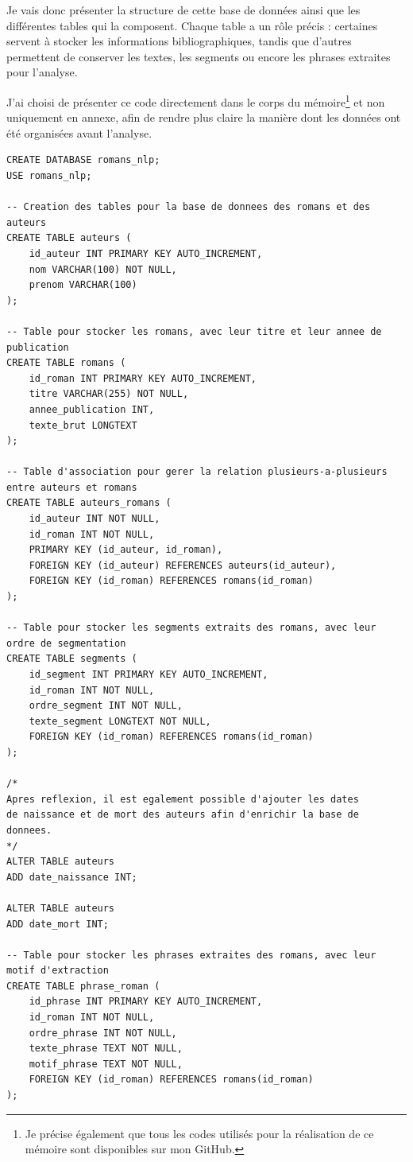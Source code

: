 Je vais donc présenter la structure de cette base de données ainsi que les différentes tables qui la composent. Chaque table a un rôle précis : certaines servent à stocker les informations bibliographiques, tandis que d'autres permettent de conserver les textes, les segments ou encore les phrases extraites pour l'analyse.

J'ai choisi de présenter ce code directement dans le corps du mémoire\footnote{Je précise également que tous les codes utilisés pour la réalisation de ce mémoire sont disponibles sur mon GitHub.} et non uniquement en annexe, afin de rendre plus claire la manière dont les données ont été organisées avant l'analyse. 

\begin{listing}[htbp]
\begin{verbatim}
CREATE DATABASE romans_nlp;
USE romans_nlp;

-- Creation des tables pour la base de donnees des romans et des auteurs
CREATE TABLE auteurs (
    id_auteur INT PRIMARY KEY AUTO_INCREMENT,
    nom VARCHAR(100) NOT NULL,
    prenom VARCHAR(100)
);

-- Table pour stocker les romans, avec leur titre et leur annee de publication
CREATE TABLE romans (
    id_roman INT PRIMARY KEY AUTO_INCREMENT,
    titre VARCHAR(255) NOT NULL,
    annee_publication INT,
    texte_brut LONGTEXT
);

-- Table d'association pour gerer la relation plusieurs-a-plusieurs entre auteurs et romans
CREATE TABLE auteurs_romans (
    id_auteur INT NOT NULL,
    id_roman INT NOT NULL,
    PRIMARY KEY (id_auteur, id_roman),
    FOREIGN KEY (id_auteur) REFERENCES auteurs(id_auteur),
    FOREIGN KEY (id_roman) REFERENCES romans(id_roman)
);

-- Table pour stocker les segments extraits des romans, avec leur ordre de segmentation
CREATE TABLE segments (
    id_segment INT PRIMARY KEY AUTO_INCREMENT,
    id_roman INT NOT NULL,
    ordre_segment INT NOT NULL,
    texte_segment LONGTEXT NOT NULL,
    FOREIGN KEY (id_roman) REFERENCES romans(id_roman)
);

/*
Apres reflexion, il est egalement possible d'ajouter les dates
de naissance et de mort des auteurs afin d'enrichir la base de donnees.
*/
ALTER TABLE auteurs
ADD date_naissance INT;

ALTER TABLE auteurs
ADD date_mort INT;

-- Table pour stocker les phrases extraites des romans, avec leur motif d'extraction
CREATE TABLE phrase_roman (
    id_phrase INT PRIMARY KEY AUTO_INCREMENT,
    id_roman INT NOT NULL,
    ordre_phrase INT NOT NULL,
    texte_phrase TEXT NOT NULL,
    motif_phrase TEXT NOT NULL,
    FOREIGN KEY (id_roman) REFERENCES romans(id_roman)
);
\end{verbatim}
\caption{Création de la base de données romans\_nlp}
\end{listing}

